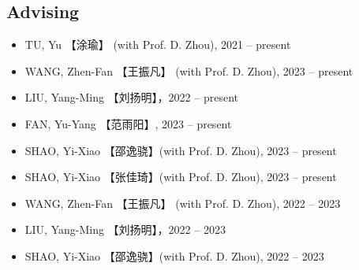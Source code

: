 \documentclass[10pt]{article}
\newenvironment{myitemize}
{ \begin{itemize}
    \setlength{\itemsep}{0pt}
    \setlength{\parskip}{0pt}
    \setlength{\parsep}{0pt}     }
{ \end{itemize}                  }
\begin{document}
\subsection*{Advising}
\begin{myitemize}
\itemsep 0.5em 
\item TU, Yu 【涂瑜】 (with Prof. D. Zhou), 2021 -- present 
\item WANG, Zhen-Fan 【王振凡】 (with Prof. D. Zhou), 2023 -- present 
\item LIU, Yang-Ming 【刘扬明】，2022 -- present

\end{myitemize}

\begin{myitemize}
\itemsep 0.5em 
\item FAN, Yu-Yang 【范雨阳】, 2023 -- present 
\item SHAO, Yi-Xiao 【邵逸骁】(with Prof. D. Zhou),   2023 -- present
\item SHAO, Yi-Xiao 【张佳琦】(with Prof. D. Zhou),   2023 -- present
\end{myitemize}

\begin{myitemize}
\itemsep 0.5em 
\item WANG, Zhen-Fan 【王振凡】 (with Prof. D. Zhou), 2022 -- 2023 
\end{myitemize}

\begin{myitemize}
\itemsep 0.5em 
\item LIU, Yang-Ming 【刘扬明】，2022 -- 2023
\item SHAO, Yi-Xiao 【邵逸骁】(with Prof. D. Zhou), 2022 -- 2023
\end{myitemize}

\end{document}
